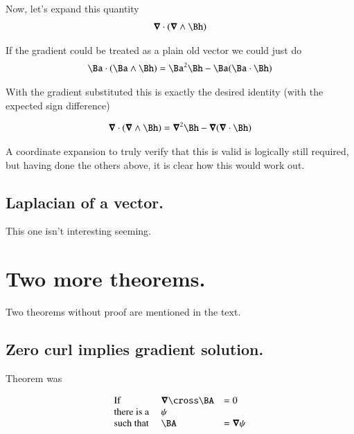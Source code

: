 Now, let's expand this quantity
\begin{align*}
\spacegrad \cdot (\spacegrad \wedge \Bh)
\end{align*}

If the gradient could be treated as a plain old vector we could just do
\begin{align*}
\Ba \cdot (\Ba \wedge \Bh) &= \Ba^2 \Bh - \Ba(\Ba \cdot \Bh) \\
\end{align*}

With the gradient substituted this is exactly the desired identity (with the expected sign difference)

\begin{align*}
\spacegrad \cdot (\spacegrad \wedge \Bh) &= \spacegrad^2 \Bh - \spacegrad(\spacegrad \cdot \Bh) \\
\end{align*}

A coordinate expansion to truly verify that this is valid is logically still required, but having done the others above, it is clear how this
would work out.

\subsection{Laplacian of a vector. }

This one isn't interesting seeming.

\section{Two more theorems. }

Two theorems without proof are mentioned in the text.

\subsection{Zero curl implies gradient solution. }

Theorem was

\begin{equation*}
\begin{array}{l l l}
\text{If} &          \spacegrad \cross \BA &= 0 \\
\text{there is a } &                  \psi &    \\
\text{such that  } & \BA &= \spacegrad \psi \\
\end{array} 
\end{equation*}


